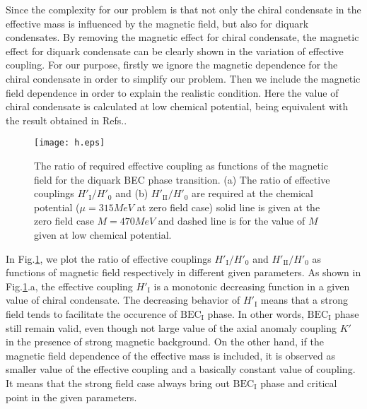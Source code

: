 \documentclass[prd, showpacs,nofootinbib,amsmath,amssymb]{revtex4}
\begin{document}
Since the complexity for our problem is that not only the chiral condensate in the effective mass is influenced by the magnetic field, but also for  diquark condensates.
By removing the magnetic effect for chiral condensate,  the magnetic effect for diquark condensate can be clearly shown in the variation of effective coupling.
For our purpose, firstly we ignore the magnetic dependence for the chiral condensate in order to simplify our problem.
Then we include the magnetic field dependence in order to explain the realistic  condition.
Here the value of chiral condensate is calculated at low chemical potential, being equivalent with the result
obtained in Refs..

\begin{figure}[h]
  \caption{  The ratio of required effective coupling as  functions of the magnetic field for  the diquark BEC phase transition. (a) The ratio of effective couplings $H'_\text{I}/H'_\text{0}$ and (b) $H'_\text{II}/H'_\text{0}$ are required at the chemical potential ($\mu=315MeV$ at zero field case)   solid line is given at the zero field case $M=470MeV$ and  dashed line is for the value of  $M$ given at low chemical potential.}
  \centering
    \texttt{[image: h.eps]}
    \label{fig:h}
\end{figure}
In Fig.\ref{fig:h},  we plot the ratio of effective couplings $H'_\text{I}/H'_\text{0}$ and $H'_\text{II}/H'_\text{0}$   as functions of  magnetic field respectively in different given parameters.
As shown in Fig.\ref{fig:h}.a, the effective coupling $H'_\text{I}$ is a monotonic decreasing function in a given value of chiral condensate.
The decreasing behavior of $H'_\text{I}$ means that a strong field tends to facilitate the occurence of $\text{BEC}_\text{I}$  phase.
In other words,   $\text{BEC}_\text{I}$ phase still remain valid, even though not  large value of the axial anomaly coupling $K'$  in the presence of strong magnetic background.
On the other hand, if the magnetic field dependence of the effective mass is included, it is observed as smaller value of the effective coupling and  a basically constant value of coupling.
It means that the strong field case always bring out $\text{BEC}_\text{I}$  phase and critical point in the given parameters.
\end{document}

